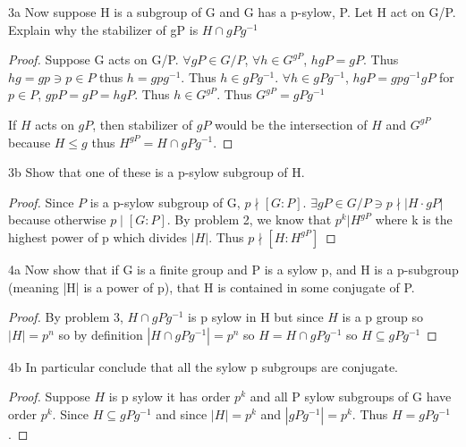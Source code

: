 \documentclass{article}
\begin{document}
\bigskip

\begin{PROB}{3a}\label{Problem 3a.}
    Now suppose H is a subgroup of G and G has a p-sylow, P.  Let H act on G/P. Explain why the stabilizer of gP is $ H \cap gPg^{-1}$
\end{PROB}
\begin{proof}
    Suppose G acts on G/P. $\forall gP \in G/P$, $\forall h \in G^{gP}$, $hgP = gP$. Thus $hg = gp \ni p \in P$ thus $h = gpg^{-1}$. Thus $h \in gPg^{-1}$. $\forall h \in gPg^{-1}$, $hgP = gpg^{-1}gP$ for $p \in P$, $gpP = gP = hgP$. Thus $h \in G^{gP}$. Thus $G^{gP} = gPg^{-1}$

    If $H$ acts on $gP$, then stabilizer of $gP$ would be the intersection of $H$ and $G^{gP}$ because $H \leq g$ thus $H^{gP} = H \cap gPg^{-1}$.
\end{proof}
\begin{PROB}{3b}\label{Problem 3b.}
    Show that one of these is a p-sylow subgroup of H.
\end{PROB}
\begin{proof}
    Since $P$ is a p-sylow subgroup of G, $p \nmid [G : P]$. $\exists gP \in G/P \ni p \nmid |H \cdot gP|$ because otherwise $p \mid [G : P]$. By problem 2, we know that $p^k | H^{gP}$ where k is the highest power of p which divides $|H|$. Thus $p \nmid [H : H^{gP}]$
\end{proof}

\bigskip
\begin{PROB}{4a}\label{Problem 4a.}
    Now show that if G is a finite group and P is a sylow p, and H is a p-subgroup (meaning |H| is a power of p), that H is contained in some conjugate of P.
\end{PROB}
\begin{proof}
    By problem 3, $H \cap gPg^{-1}$ is p sylow in H but since $H$ is a p group so $|H| = p^n$ so by definition $|H \cap gPg^{-1}| = p^n$ so $H = H \cap gPg^{-1}$ so $H \subseteq gPg^{-1}$
\end{proof}

\begin{PROB}{4b}\label{Problem 4b.}
    In particular conclude that all the sylow p subgroups are conjugate. 
\end{PROB}
\begin{proof}
    Suppose $H$ is p sylow it has order $p^k$ and all P sylow subgroups of G have order $p^k$. Since $H \subseteq gPg^{-1}$ and since $|H| = p^k$ and $|gPg^{-1}| = p^k$. Thus $H = gPg^{-1}$. 
\end{proof}
\end{document}
